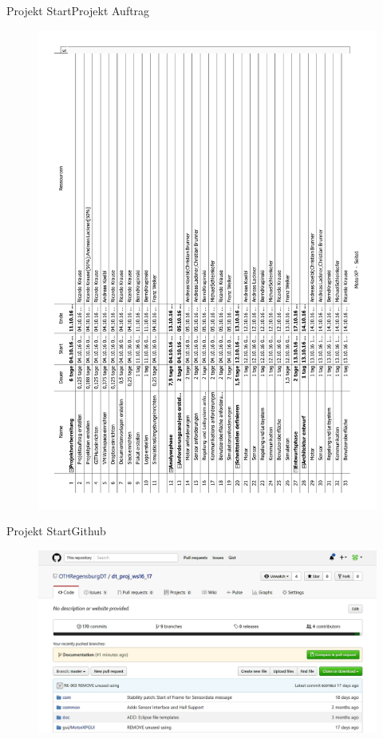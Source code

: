\begin{frame}{Projekt Start}{Projekt Auftrag}
	\begin{figure} [htbp]
 		\centering
 		\includegraphics[scale=0.3,angle=270]{../projectdefinition/Appendix/DT_Projektplan_Gr3_MotorXP_2.pdf}
	\end{figure}
\end{frame}
\begin{frame}{Projekt Start}{Github}
	\begin{figure} [htbp]
 		\centering
 			\includegraphics[scale=0.3]{../projectdefinition/Bilder/Github.png}
	\end{figure}
\end{frame}
